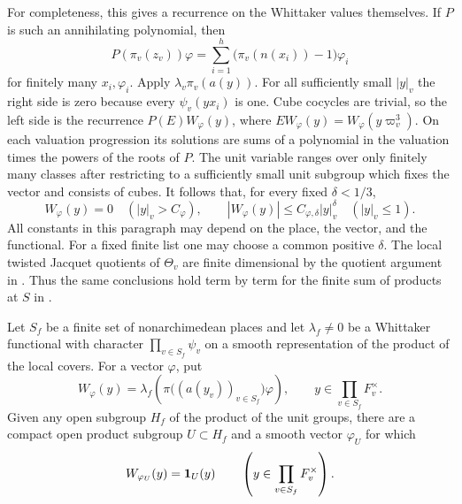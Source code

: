 For completeness, this gives a recurrence on the Whittaker values
themselves.  If \(P\) is such an annihilating polynomial, then
\[
 P(\pi_v(z_v))\varphi
   =\sum_{i=1}^h\bigl(\pi_v(n(x_i))-1\bigr)\varphi_i
\]
for finitely many \(x_i,\varphi_i\).  Apply
\(\lambda_v\pi_v(a(y))\).  For all sufficiently small \(|y|_v\) the
right side is zero because every \(\psi_v(yx_i)\) is one.  Cube
cocycles are trivial, so the left side is the recurrence \(P(E)W_\varphi(y)\),
where \(E W_\varphi(y)=W_\varphi(y\varpi_v^3)\).
On each valuation progression its solutions are sums of a polynomial
in the valuation times the powers of the roots of \(P\).
The unit variable ranges over only finitely many classes after
restricting to a sufficiently small unit subgroup which fixes the
vector and consists of cubes.  It follows that, for every fixed
\(\delta<1/3\),
\begin{equation}\label{eq:theta-finite-bounds}
 W_\varphi(y)=0\quad(|y|_v>C_\varphi),\qquad
 |W_\varphi(y)|\le C_{\varphi,\delta}|y|_v^\delta
       \quad(|y|_v\le1).
\end{equation}
All constants in this paragraph may depend on the place, the vector,
and the functional.  For a fixed finite list one may choose a common
positive \(\delta\).  The local twisted Jacquet quotients of
\(\Theta_v\) are finite dimensional by the quotient argument in
.  Thus the same conclusions
hold term by term for the finite sum of products at \(S\) in
.

\begin{lemma}\label{lem:finite-whittaker-cutoff}
Let \(S_f\) be a finite set of nonarchimedean places and let
\(\lambda_f\ne0\) be a Whittaker functional with character
\(\prod_{v\in S_f}\psi_v\) on a smooth representation of the product
of the local covers.  For a vector \(\varphi\), put
\[
 W_\varphi(y)=\lambda_f\!\left(\pi\bigl((a(y_v))_{v\in S_f}\bigr)
                         \varphi\right),
 \qquad y\in\prod_{v\in S_f}F_v^\times.
\]
Given any open subgroup \(H_f\) of the product of the unit groups,
there are a compact open product subgroup \(U\subset H_f\) and a
smooth vector \(\varphi_U\) for which
\[
 W_{\varphi_U}(y)=\mathbf{1}_U(y)
 \qquad\left(y\in\prod_{v\in S_f}F_v^\times\right).
\]
\end{lemma}

